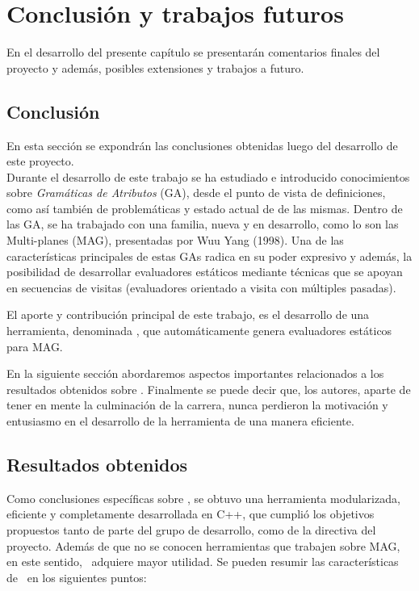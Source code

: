 \chapter{Conclusión y trabajos futuros}
\label{chap:conclusiones}

\minitoc

En el desarrollo del presente capítulo se presentarán comentarios finales del proyecto y además, posibles extensiones y trabajos a futuro.

\section{Conclusión}

En esta sección se expondrán las conclusiones obtenidas luego del desarrollo de este proyecto.\\

Durante el desarrollo de este trabajo se ha estudiado e introducido conocimientos sobre \textit{Gramáticas de Atributos} (GA), desde el punto de vista de definiciones, como así también de problemáticas y estado actual de de las mismas. Dentro de las GA, se ha trabajado con una familia, nueva y en desarrollo, como lo son las Multi-planes (MAG), presentadas por Wuu Yang (1998). Una de las características principales de estas GAs radica en su poder expresivo  y además, la posibilidad de desarrollar evaluadores estáticos mediante técnicas que se apoyan en secuencias de visitas (evaluadores orientado a visita con múltiples pasadas). 

El aporte y contribución principal de este trabajo, es el desarrollo de una herramienta, denominada \maggen, que automáticamente genera evaluadores estáticos para MAG.

En la siguiente sección abordaremos aspectos importantes relacionados a los resultados obtenidos sobre \maggen. Finalmente se puede decir que, los autores, aparte de tener en mente la culminación de la carrera, nunca perdieron la motivación y entusiasmo en el desarrollo de la herramienta de una manera eficiente.

\section{Resultados obtenidos}

Como conclusiones específicas sobre \maggen, se obtuvo una herramienta modularizada, eficiente y completamente desarrollada en C++, que cumplió los objetivos propuestos tanto de parte del grupo de desarrollo, como de la directiva del proyecto. Además de que no se conocen herramientas que trabajen sobre MAG, en este sentido, \maggen\ adquiere mayor utilidad. Se pueden resumir las características de \maggen\ en los siguientes puntos:

